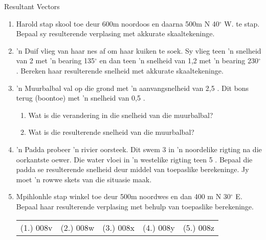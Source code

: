 \begin{exercises}{Resultant Vectors}{ \noindent\vspace{-1cm}
\begin{enumerate}[noitemsep, label=\textbf{\arabic*}.]
\item Harold stap skool toe deur 600m noordoos en daarna 500m N 40$^\circ$ W. te stap. Bepaal sy resulterende verplasing met akkurate skaaltekeninge.
\item  'n Duif vlieg van haar nes af om haar kuiken te soek. Sy vlieg teen  'n snelheid van 2 \ms met  'n bearing 135$^\circ$ en dan teen  'n snelheid van 1,2 \ms met  'n bearing 230$^\circ$. Bereken haar resulterende snelheid met akkurate skaaltekeninge.
\item  'n Muurbalbal val op die grond met  'n aanvangsnelheid van 2,5 \ms. Dit bons terug (boontoe) met  'n snelheid van 0,5 \ms. \begin{enumerate}
	\item Wat is die verandering in die snelheid van die muurbalbal?
	\item Wat is die resulterende snelheid van die muurbalbal?
	\end{enumerate}
\item  'n Padda probeer  'n rivier oorsteek. Dit swem 3 \ms in  'n noordelike rigting na die oorkantste oewer. Die water vloei in  'n westelike rigting teen 5 \ms. Bepaal die padda se resulterende snelheid deur middel van toepaslike berekeninge. Jy moet  'n rowwe skets van die situasie maak.
\item Mpihlonhle stap winkel toe deur 500m noordwes en dan 400 m N 30$^\circ$ E. Bepaal haar resulterende verplasing met behulp van toepaslike berekeninge.
  \label{59e414b70efc194a27a122db47d06ce6**end}
\par \practiceinfo
 \par \begin{tabular}[h]{ccccc}
 (1.) 008v  &  (2.) 008w  &  (3.) 008x &  (4.) 008y  &  (5.) 008z\end{tabular}
\end{enumerate}
}
\end{exercises}



